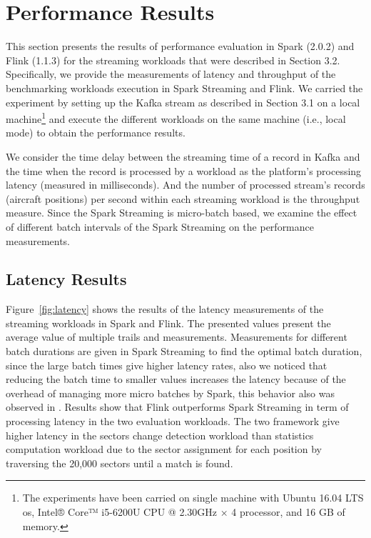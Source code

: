 \documentclass[]{article}
\begin{document}
\section{Performance Results}
\label{sec:sec4}
\par This section presents the results of performance evaluation in Spark (2.0.2) and Flink (1.1.3) for the streaming workloads that were described in Section 3.2. Specifically, we provide  the measurements of latency and throughput of the benchmarking workloads execution in Spark Streaming and Flink. We carried the experiment by setting up the Kafka stream as described in Section 3.1 on a local machine\footnote{ The experiments have been carried  on single machine with Ubuntu 16.04 LTS os, Intel® Core™ i5-6200U CPU @ 2.30GHz × 4  processor, and 16 GB of memory.} and execute the different workloads on the same machine (i.e., local mode) to obtain the performance results.  

\par We consider the time delay between the streaming time of a record in Kafka and  the time when the record is processed by a workload as the platform's processing latency (measured in milliseconds). And the number of processed stream's records (aircraft positions) per second within each streaming workload is the throughput measure. Since the Spark Streaming is micro-batch based,  we examine the effect of different batch intervals
of the Spark Streaming on the performance measurements.


\subsection{Latency Results}

Figure~\ref{fig:latency} shows the results of the latency measurements of the streaming workloads in Spark and Flink. The presented values present the average value of multiple trails and measurements. Measurements for different batch durations are given in Spark Streaming to find the optimal batch duration, since  the large batch times give higher latency rates, also we noticed that reducing the batch time to smaller values increases the latency because of the overhead of managing more micro batches by Spark, this behavior also was observed in \cite{yahoo}. Results show that Flink outperforms Spark Streaming in term of processing latency in the two evaluation workloads. The two framework give higher latency in the sectors change detection workload than statistics computation workload due to the sector assignment for each position by traversing the 20,000 sectors until a match is found.
\end{document}
